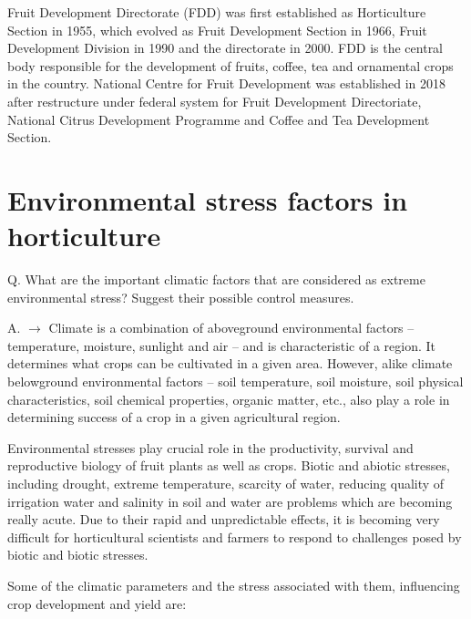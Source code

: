 \documentclass[
  openany]{book}
\begin{document}
Fruit Development Directorate (FDD) was first established as Horticulture Section in 1955, which evolved as Fruit Development Section in 1966, Fruit Development Division in 1990 and the directorate in 2000. FDD is the central body responsible for the development of fruits, coffee, tea and ornamental crops in the country. National Centre for Fruit Development was established in 2018 after restructure under federal system for Fruit Development Directoriate, National Citrus Development Programme and Coffee and Tea Development Section.

\hypertarget{environmental-stress-factors-in-horticulture}{%
\section{Environmental stress factors in horticulture}\label{environmental-stress-factors-in-horticulture}}

Q. What are the important climatic factors that are considered as extreme environmental stress? Suggest their possible control measures.

A. \(\longrightarrow\) Climate is a combination of aboveground environmental factors -- temperature, moisture, sunlight and air -- and is characteristic of a region. It determines what crops can be cultivated in a given area. However, alike climate belowground environmental factors -- soil temperature, soil moisture, soil physical characteristics, soil chemical properties, organic matter, etc., also play a role in determining success of a crop in a given agricultural region.

Environmental stresses play crucial role in the productivity, survival and reproductive biology of fruit plants as well as crops. Biotic and abiotic stresses, including drought, extreme temperature, scarcity of water, reducing quality of irrigation water and salinity in soil and water are problems which are becoming really acute. Due to their rapid and unpredictable effects, it is becoming very difficult for horticultural scientists and farmers to respond to challenges posed by biotic and biotic stresses.

Some of the climatic parameters and the stress associated with them, influencing crop development and yield are:
\end{document}
